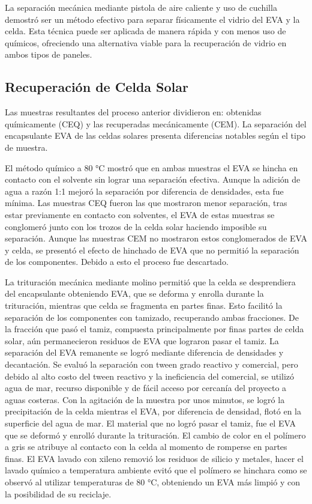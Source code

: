  La separación mecánica mediante pistola de aire caliente y uso de cuchilla demostró ser un método efectivo para separar físicamente el vidrio del EVA y la celda. Esta técnica puede ser aplicada de manera rápida y con menos uso de químicos, ofreciendo una alternativa viable para la recuperación de vidrio en ambos tipos de paneles.
 
 \subsection{Recuperación de Celda Solar}
 \label{subsec:Conclusiones recuperación de celda}
 
 Las muestras resultantes del proceso anterior dividieron en: obtenidas químicamente (CEQ) y las recuperadas mecánicamente (CEM). La separación del encapsulante EVA de las celdas solares presenta diferencias notables según el tipo de muestra. 
 
 El método químico a 80 °C mostró que en ambas muestras el EVA se hincha en contacto con el solvente sin lograr una separación efectiva. Aunque la adición de agua a razón 1:1 mejoró la separación por diferencia de densidades, esta fue mínima. Las muestras CEQ fueron las que mostraron menor separación, tras estar previamente en contacto con solventes, el EVA de estas muestras se conglomeró junto con los trozos de la celda solar haciendo imposible su separación. Aunque las muestras CEM no mostraron estos conglomerados de EVA y celda, se presentó el efecto de hinchado de EVA que no permitió la separación de los componentes. Debido a esto el proceso fue descartado. 
 
 La trituración mecánica mediante molino permitió que la celda se desprendiera del encapsulante obteniendo EVA, que se deforma y enrolla durante la trituración, mientras que celda se fragmenta en partes finas. Esto facilitó la separación de los componentes con tamizado, recuperando ambas fracciones.  
 De la fracción que pasó el tamiz, compuesta principalmente por finas partes de celda solar, aún permanecieron residuos de EVA que lograron pasar el tamiz. La separación del EVA remanente se logró mediante diferencia de densidades y decantación. Se evaluó la separación con tween grado reactivo y comercial, pero debido al alto costo del tween reactivo y la ineficiencia del comercial, se utilizó agua de mar, recurso disponible y de fácil acceso por cercanía del proyecto a aguas costeras. Con la agitación de la muestra por unos minutos, se logró la precipitación de la celda mientras el EVA, por diferencia de densidad, flotó en la superficie del agua de mar. 
 El material que no logró pasar el tamiz, fue el EVA que se deformó y enrolló durante la trituración. El cambio de color en el polímero a gris se atribuye al contacto con la celda al momento de romperse en partes finas. El EVA lavado con xileno removió los residuos de silicio y metales, hacer el lavado químico a temperatura ambiente evitó que el polímero se hinchara como se observó al utilizar temperaturas de 80 °C, obteniendo un EVA más limpió y con la posibilidad de su reciclaje. 
 

